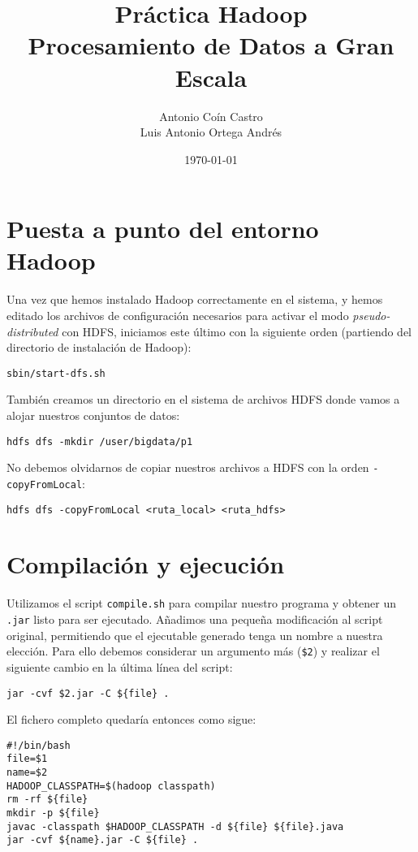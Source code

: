 \documentclass[11pt]{article}
\author{Antonio Coín Castro\\ Luis Antonio Ortega Andrés}
\date{\today}
\title{Práctica Hadoop\\\medskip
\large Procesamiento de Datos a Gran Escala}
\begin{document}
\maketitle

\section*{Puesta a punto del entorno Hadoop}

Una vez que hemos instalado Hadoop correctamente en el sistema, y hemos editado los archivos de configuración necesarios para activar el modo \textit{pseudo-distributed} con HDFS, iniciamos este último con la siguiente orden (partiendo del directorio de instalación de Hadoop):

\begin{verbatim}
sbin/start-dfs.sh
\end{verbatim}

También creamos un directorio en el sistema de archivos HDFS donde vamos a alojar nuestros conjuntos de datos:

\begin{verbatim}
hdfs dfs -mkdir /user/bigdata/p1
\end{verbatim}

No debemos olvidarnos de copiar nuestros archivos a HDFS con la orden \verb|-copyFromLocal|:

\begin{verbatim}
hdfs dfs -copyFromLocal <ruta_local> <ruta_hdfs>
\end{verbatim}

\section*{Compilación y ejecución}

Utilizamos el script \verb|compile.sh| para compilar nuestro programa y obtener un \verb|.jar| listo para ser ejecutado. Añadimos una pequeña modificación al script original, permitiendo que el ejecutable generado tenga un nombre a nuestra elección. Para ello debemos considerar un argumento más (\texttt{\$2}) y realizar el siguiente cambio en la última línea del script:

\begin{verbatim}
jar -cvf $2.jar -C ${file} .
\end{verbatim}

El fichero completo quedaría entonces como sigue:

\begin{verbatim}
#!/bin/bash
file=$1
name=$2
HADOOP_CLASSPATH=$(hadoop classpath)
rm -rf ${file}
mkdir -p ${file}
javac -classpath $HADOOP_CLASSPATH -d ${file} ${file}.java
jar -cvf ${name}.jar -C ${file} .
\end{verbatim}
\end{document}
